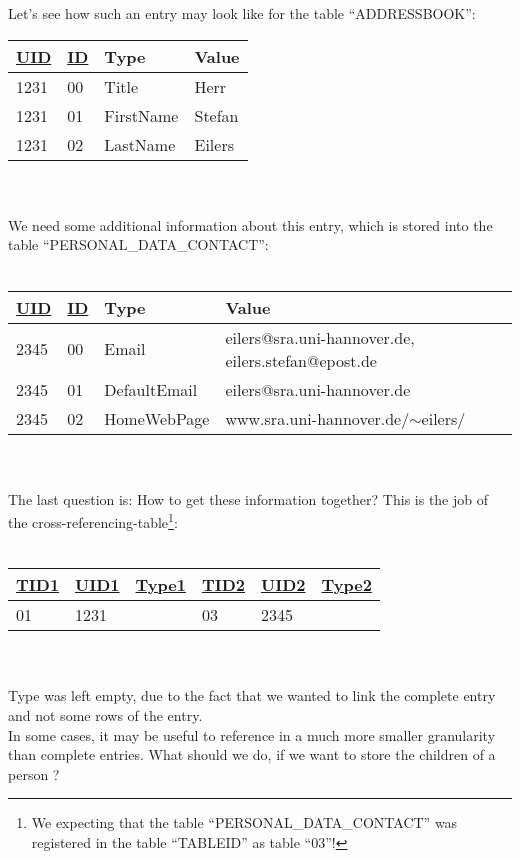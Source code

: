 Let's see how such an entry may look like for the table ``ADDRESSBOOK'':

\begin{tabular}[ht]{|l|l|l|l|}
\hline
\underline{UID} & \underline{ID} & Type & Value\\
\hline
 1231& 00& Title& Herr\\
\hline
 1231& 01& FirstName& Stefan\\
\hline
 1231& 02& LastName& Eilers\\
\hline
\end{tabular}
\\
\\
We need some additional information about this entry, which is stored into the table ``PERSONAL\_DATA\_CONTACT'':
\\
\\
\begin{tabular}[ht]{|l|l|l|l|}
\hline
\underline{UID} & \underline{ID} & Type & Value\\
\hline
 2345& 00& Email& eilers@sra.uni-hannover.de, eilers.stefan@epost.de\\
\hline
 2345& 01& DefaultEmail& eilers@sra.uni-hannover.de\\
\hline
 2345& 02& HomeWebPage& www.sra.uni-hannover.de/$\sim$eilers/\\
\hline
\end{tabular}
\\
\\
The last question is: How to get these information together? This is the job of the cross-referencing-table\footnote{We expecting that the table ``PERSONAL\_DATA\_CONTACT'' was registered in the table ``TABLEID'' as table ``03''!}:
\\
\\
\begin{tabular}[ht]{|l|l|l|l|l|l|}
\hline
\underline{TID1} & \underline{UID1} & \underline{Type1} & \underline{TID2} & \underline{UID2} & \underline{Type2} \\
\hline
 01& 1231& & 03& 2345&\\
\hline
\end{tabular}
\\
\\
Type was left empty, due to the fact that we wanted to link the complete entry and not some rows of the entry.
\\
In some cases, it may be useful to reference in a much more smaller granularity than complete entries. What should we do, if we want to store the children of a person ? 
